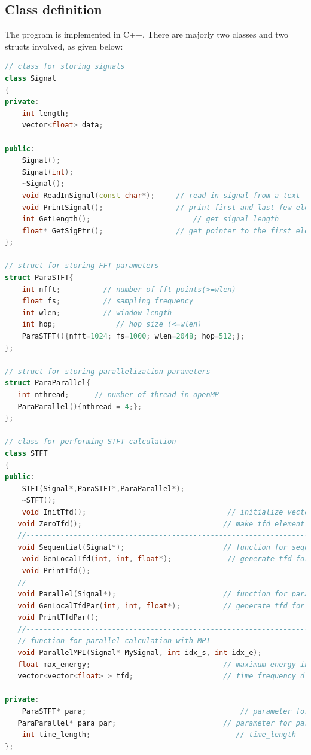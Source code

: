 \documentclass[11pt,letter]{article}
\begin{document}
\subsection{Class definition}
The program is implemented in C++. There are majorly two classes and two structs involved, as given below:

\begin{lstlisting}[language=C++]
// class for storing signals
class Signal
{
private:
	int length;
	vector<float> data;

public:
	Signal();
	Signal(int);
	~Signal();
	void ReadInSignal(const char*);		// read in signal from a text file
	void PrintSignal();					// print first and last few element of the signal
	int GetLength();						// get signal length
	float* GetSigPtr();					// get pointer to the first element
};

// struct for storing FFT parameters
struct ParaSTFT{
	int nfft;		   // number of fft points(>=wlen)
	float fs;		   // sampling frequency
	int wlen;		   // window length
	int hop;		      // hop size (<=wlen)
	ParaSTFT(){nfft=1024; fs=1000; wlen=2048; hop=512;};
};

// struct for storing parallelization parameters
struct ParaParallel{
   int nthread;      // number of thread in openMP
   ParaParallel(){nthread = 4;};
};

// class for performing STFT calculation
class STFT
{
public:
	STFT(Signal*,ParaSTFT*,ParaParallel*);
	~STFT();
	void InitTfd();                                 // initialize vector<vector<float> > tfd
   void ZeroTfd();                                 // make tfd element being 0
   //-------------------------------------------------------------------------------
   void Sequential(Signal*);                       // function for sequential calculation
	void GenLocalTfd(int, int, float*);             // generate tfd for a segment of signal   
	void PrintTfd();
   //-------------------------------------------------------------------------------
   void Parallel(Signal*);                         // function for parallel calculation
   void GenLocalTfdPar(int, int, float*);          // generate tfd for a segment of signal
   void PrintTfdPar();
   //-------------------------------------------------------------------------------
   // function for parallel calculation with MPI
   void ParallelMPI(Signal* MySignal, int idx_s, int idx_e);   
   float max_energy;                               // maximum energy in the tfd
   vector<vector<float> > tfd;                     // time frequency distribution (tfd)

private:
	ParaSTFT* para; 		                           // parameter for STFT
   ParaParallel* para_par;                         // parameter for parallelization
	int time_length;	                              // time_length
};
\end{lstlisting}
\end{document}
